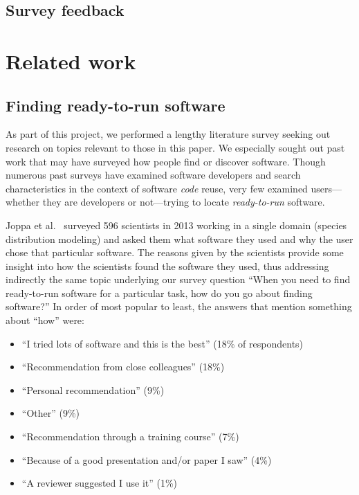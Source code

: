 \documentclass{casicswhitepaper}
\begin{document}
\subsection{Survey feedback}


\section{Related work}

\subsection{Finding ready-to-run software}

As part of this project, we performed a lengthy literature survey seeking out research on topics relevant to those in this paper.  We especially sought out past work that may have surveyed how people find or discover software.  Though numerous past surveys have examined software developers and search characteristics in the context of software \emph{code} reuse, very few examined users---whether they are developers or not---trying to locate \emph{ready-to-run} software.

Joppa et al.~\cite{joppa2013troubling} surveyed 596 scientists in 2013 working in a single domain (species distribution modeling) and asked them what software they used and why the user chose that particular software.  The reasons given by the scientists provide some insight into how the scientists found the software they used, thus addressing indirectly the same topic underlying our survey question ``When you need to find ready-to-run software for a particular task, how do you go about finding software?''  In order of most popular to least, the answers that mention something about ``how'' were:
\begin{itemize}

\item ``I tried lots of software and this is the best'' (18\% of respondents)
\item ``Recommendation from close colleagues'' (18\%)
\item ``Personal recommendation'' (9\%)
\item ``Other'' (9\%)
\item ``Recommendation through a training course'' (7\%)
\item ``Because of a good presentation and/or paper I saw'' (4\%)
\item ``A reviewer suggested I use it'' (1\%)

\end{itemize}
\end{document}
